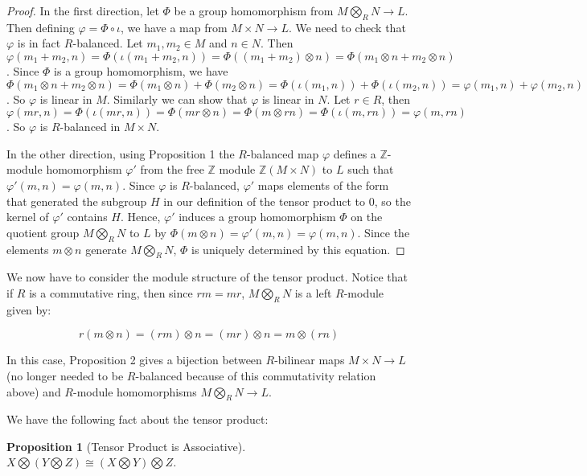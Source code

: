 \documentclass[11pt]{article}
\theoremstyle{definition}
\theoremstyle{plain}
\theoremstyle{plain}
\newtheorem{prop}{Proposition}
\theoremstyle{plain}
\theoremstyle{definition}
\begin{document}
\begin{proof}
In the first direction, let $\Phi$ be a group homomorphism from $M \bigotimes_R N \to L$. Then defining $\varphi = \Phi \circ \iota$, we have a map from $M \times N \to L$. We need to check that $\varphi$ is in fact $R$-balanced. Let $m_1, m_2 \in M$ and $n \in N$. Then $\varphi(m_1 + m_2, n) = \Phi(\iota(m_1 + m_2, n)) = \Phi((m_1 + m_2) \otimes n) = \Phi(m_1 \otimes n + m_2 \otimes n)$. Since $\Phi$ is a group homomorphism, we have $\Phi(m_1 \otimes n + m_2 \otimes n) = \Phi(m_1 \otimes n) + \Phi(m_2 \otimes n) = \Phi(\iota(m_1, n)) + \Phi(\iota(m_2, n)) = \varphi(m_1, n) + \varphi(m_2, n)$. So $\varphi$ is linear in $M$. Similarly we can show that $\varphi$ is linear in $N$. Let $r \in R$, then $\varphi(mr, n) = \Phi(\iota(mr, n)) = \Phi(mr \otimes n) = \Phi(m \otimes rn) = \Phi(\iota(m, rn)) = \varphi(m, rn)$. So $\varphi$ is $R$-balanced in $M \times N$.

In the other direction, using Proposition 1 the $R$-balanced map $\varphi$ defines a $\mathbb{Z}$-module homomorphism $\varphi'$ from the free $\mathbb{Z}$ module $\mathbb{Z}(M \times N)$ to $L$ such that $\varphi'(m, n) = \varphi(m, n)$. Since $\varphi$ is $R$-balanced, $\varphi'$ maps elements of the form that generated the subgroup $H$ in our definition of the tensor product to $0$, so the kernel of $\varphi'$ contains $H$. Hence, $\varphi'$ induces a group homomorphism $\Phi$ on the quotient group $M \bigotimes_R N$ to $L$ by $\Phi(m \otimes n) = \varphi'(m, n) = \varphi(m, n)$. Since the elements $m \otimes n$ generate $M \bigotimes_R N$, $\Phi$ is uniquely determined by this equation.
\end{proof}

We now have to consider the module structure of the tensor product. Notice that if $R$ is a commutative ring, then since $rm = mr$, $M \bigotimes_R N$ is a left $R$-module given by:

\begin{equation*}
r(m \otimes n) = (rm) \otimes n = (mr) \otimes n = m \otimes (rn)
\end{equation*}

In this case, Proposition 2 gives a bijection between $R$-bilinear maps  $M \times N \to L$ (no longer needed to be $R$-balanced because of this commutativity relation above) and $R$-module homomorphisms $M \bigotimes_R N \to L$.

We have the following fact about the tensor product:

\begin{prop}[Tensor Product is Associative]
$X \bigotimes (Y \bigotimes Z) \cong (X \bigotimes Y) \bigotimes Z$.
\end{prop}
\end{document}

